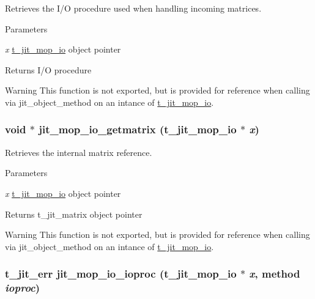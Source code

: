 Retrieves the I/O procedure used when handling incoming matrices. 
\begin{DoxyParams}{Parameters}
\item[{\em x}]\hyperlink{structt__jit__mop__io}{t\_\-jit\_\-mop\_\-io} object pointer\end{DoxyParams}
\begin{DoxyReturn}{Returns}
I/O procedure
\end{DoxyReturn}
\begin{DoxyWarning}{Warning}
This function is not exported, but is provided for reference when calling via jit\_\-object\_\-method on an intance of \hyperlink{structt__jit__mop__io}{t\_\-jit\_\-mop\_\-io}. 
\end{DoxyWarning}
\hypertarget{group__mopmod_ga9d85ffd0468e137ca0b87bd1ecfb98b4}{
\subsubsection[{jit\_\-mop\_\-io\_\-getmatrix}]{\setlength{\rightskip}{0pt plus 5cm}void $\ast$ jit\_\-mop\_\-io\_\-getmatrix ({\bf t\_\-jit\_\-mop\_\-io} $\ast$ {\em x})}}
\label{group__mopmod_ga9d85ffd0468e137ca0b87bd1ecfb98b4}


Retrieves the internal matrix reference. 
\begin{DoxyParams}{Parameters}
\item[{\em x}]\hyperlink{structt__jit__mop__io}{t\_\-jit\_\-mop\_\-io} object pointer\end{DoxyParams}
\begin{DoxyReturn}{Returns}
t\_\-jit\_\-matrix object pointer
\end{DoxyReturn}
\begin{DoxyWarning}{Warning}
This function is not exported, but is provided for reference when calling via jit\_\-object\_\-method on an intance of \hyperlink{structt__jit__mop__io}{t\_\-jit\_\-mop\_\-io}. 
\end{DoxyWarning}
\hypertarget{group__mopmod_gaeeb0806f2942f47b2eacb7b57331dfca}{
\subsubsection[{jit\_\-mop\_\-io\_\-ioproc}]{\setlength{\rightskip}{0pt plus 5cm}t\_\-jit\_\-err jit\_\-mop\_\-io\_\-ioproc ({\bf t\_\-jit\_\-mop\_\-io} $\ast$ {\em x}, \/  {\bf method} {\em ioproc})}}
\label{group__mopmod_gaeeb0806f2942f47b2eacb7b57331dfca}


